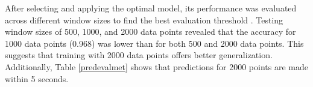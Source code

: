 \documentclass[runningheads]{llncs}
\begin{document}


After selecting and applying the optimal model, its performance was evaluated across different window sizes to find the best evaluation threshold \cite{b17}. Testing window sizes of 500, 1000, and 2000 data points revealed that the accuracy for 1000 data points (0.968) was lower than for both 500 and 2000 data points. This suggests that training with 2000 data points offers better generalization. Additionally, Table \ref{predevalmet} shows that predictions for 2000 points are made within 5 seconds.
\end{document}
